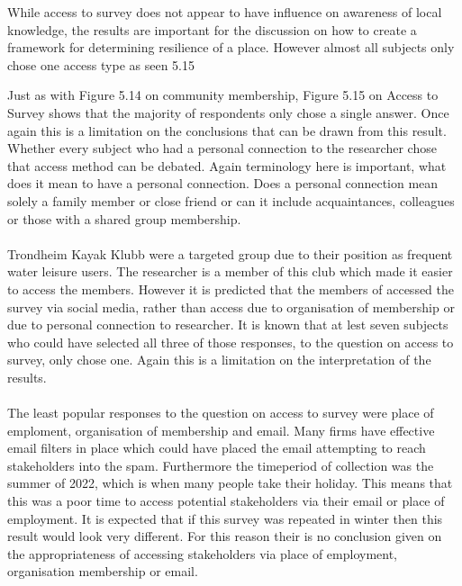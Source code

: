 While access to survey does not appear to have influence on awareness of local knowledge, the results are important for the discussion on how to create a framework for determining resilience of a place. However almost all subjects only chose one access type as seen 5.15

Just as with Figure 5.14 on community membership, Figure 5.15 on Access to Survey shows that the majority of respondents only chose a single answer. Once again this is a limitation on the conclusions that can be drawn from this result. Whether every subject who had a personal connection to the researcher chose that access method can be debated. Again terminology here is important, what does it mean to have a personal connection. Does a personal connection mean solely a family member or close friend or can it include acquaintances, colleagues or those with a shared group membership. 
\paragraph{}
Trondheim Kayak Klubb were a targeted group due to their position as frequent water leisure users. The researcher is a member of this club which made it easier to access the members. However it is predicted that the members of accessed the survey via social media, rather than access due to organisation of membership or due to personal connection to researcher. It is known that at lest seven subjects who could have selected all three of those responses, to the question on access to survey, only chose one. Again this is a limitation on the interpretation of the results. 
\paragraph{}
The least popular responses to the question on access to survey were place of emploment, organisation of membership and email. Many firms have effective email filters in place which could have placed the email attempting to reach stakeholders into the spam. Furthermore the timeperiod of collection was the summer of 2022, which is when many people take their holiday. This means that this was a poor time to access potential stakeholders via their email or place of employment. It is expected that if this survey was repeated in winter then this result would look very different. For this reason their is no conclusion given on the appropriateness of accessing stakeholders via place of employment, organisation membership or email.
